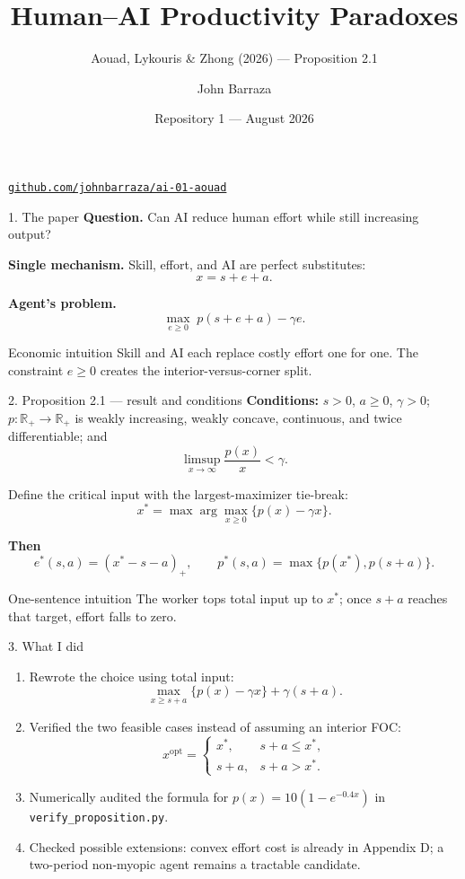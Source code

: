 \documentclass[aspectratio=169,11pt]{beamer}
\title{Human--AI Productivity Paradoxes}
\subtitle{Aouad, Lykouris \& Zhong (2026) --- Proposition 2.1}
\author{John Barraza}
\institute{Artificial Intelligence and Economic Modeling\\Universidad del Pacífico}
\date{Repository 1 --- August 2026}
\newcommand{\repolink}{https://github.com/johnbarraza/ai-01-aouad}
\begin{document}
\begin{frame}[plain]
  \titlepage
  \vspace{-0.8em}
  \begin{center}
    \small\href{\repolink}{\texttt{github.com/johnbarraza/ai-01-aouad}}
  \end{center}
\end{frame}

\begin{frame}{1. The paper}
  \textbf{Question.} Can AI reduce human effort while still increasing output?

  \medskip
  \textbf{Single mechanism.} Skill, effort, and AI are perfect substitutes:
  \[
    x=s+e+a.
  \]

  \textbf{Agent's problem.}
  \[
    \max_{e\geq0}\;p(s+e+a)-\gamma e.
  \]

  \begin{block}{Economic intuition}
    Skill and AI each replace costly effort one for one. The constraint
    $e\geq0$ creates the interior-versus-corner split.
  \end{block}
\end{frame}

\begin{frame}{2. Proposition 2.1 --- result and conditions}
  \small
  \textbf{Conditions:} $s>0$, $a\geq0$, $\gamma>0$; $p:\mathbb R_+\to\mathbb R_+$
  is weakly increasing, weakly concave, continuous, and twice differentiable;
  and
  \[
    \limsup_{x\to\infty}\frac{p(x)}{x}<\gamma.
  \]

  Define the critical input with the \alert{largest-maximizer tie-break}:
  \[
    x^*=\max\arg\max_{x\geq0}\{p(x)-\gamma x\}.
  \]

  \textbf{Then}
  \[
    e^*(s,a)=(x^*-s-a)_+,
    \qquad
    p^*(s,a)=\max\{p(x^*),p(s+a)\}.
  \]

  \begin{block}{One-sentence intuition}
    The worker tops total input up to $x^*$; once $s+a$ reaches that target,
    effort falls to zero.
  \end{block}
\end{frame}

\begin{frame}{3. What I did}
  \begin{enumerate}
    \item Rewrote the choice using total input:
      \[
        \max_{x\geq s+a}\{p(x)-\gamma x\}+\gamma(s+a).
      \]
    \item Verified the two feasible cases instead of assuming an interior FOC:
      \[
      x^{\mathrm{opt}}=
      \begin{cases}
        x^*, & s+a\leq x^*,\\
        s+a, & s+a>x^*.
      \end{cases}
      \]
    \item Numerically audited the formula for
      $p(x)=10(1-e^{-0.4x})$ in \texttt{verify\_proposition.py}.
    \item Checked possible extensions: convex effort cost is already in
      Appendix D; a two-period non-myopic agent remains a tractable candidate.
  \end{enumerate}
\end{frame}
\end{document}
